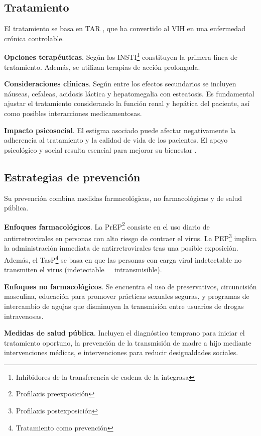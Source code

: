 \begin{enumerate}
\subsection{Tratamiento}
El tratamiento se basa en TAR \cite{heendeniya2019antiretroviral}, que ha convertido al VIH en una enfermedad crónica controlable.

\textbf{Opciones terapéuticas}. Según \cite{sivanandy2023efficacy} los INSTI\footnote{Inhibidores de la transferencia de cadena de la integrasa} constituyen la primera línea de tratamiento. Además, se utilizan terapias de acción prolongada.

\textbf{Consideraciones clínicas}. Según \cite{saag2021hiv} entre los efectos secundarios se incluyen náuseas, cefaleas, acidosis láctica y hepatomegalia con esteatosis. Es fundamental ajustar el tratamiento considerando la función renal y hepática del paciente, así como posibles interacciones medicamentosas.

\textbf{Impacto psicosocial}. El estigma asociado puede afectar negativamente la adherencia al tratamiento y la calidad de vida de los pacientes. El apoyo psicológico y social resulta esencial para mejorar su bienestar  \cite{cihlar2016current}.

\subsection{Estrategias de prevención}
Su prevención \cite{chan2012biomedical} combina medidas farmacológicas, no farmacológicas y de salud pública.

\textbf{Enfoques farmacológicos}.
La PrEP\footnote{Profilaxis preexposición} consiste en el uso diario de antirretrovirales en personas con alto riesgo de contraer el virus. La PEP\footnote{Profilaxis postexposición} implica la administración inmediata de antirretrovirales tras una posible exposición. Además, el TasP\footnote{Tratamiento como prevención} se basa en que las personas con carga viral indetectable no transmiten el virus (indetectable = intransmisible).

\textbf{Enfoques no farmacológicos}.
Se encuentra el uso de preservativos, circuncisión masculina, educación para promover prácticas sexuales seguras, y programas de intercambio de agujas que disminuyen la transmisión entre usuarios de drogas intravenosas.

\textbf{Medidas de salud pública}.
Incluyen el diagnóstico temprano para iniciar el tratamiento oportuno, la prevención de la transmisión de madre a hijo mediante intervenciones médicas, e intervenciones para reducir desigualdades sociales.


\end{enumerate}

